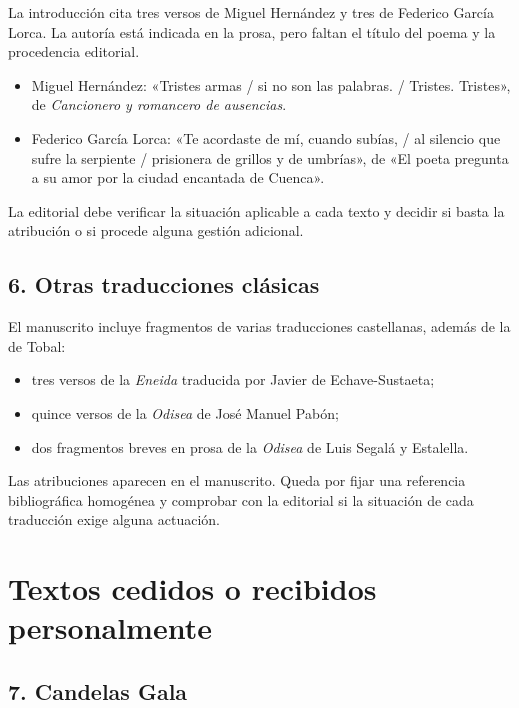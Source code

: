 \documentclass[12pt,a4paper]{article}
\begin{document}
La introducción cita tres versos de Miguel Hernández y tres de Federico García Lorca. La autoría está indicada en la prosa, pero faltan el título del poema y la procedencia editorial.

\begin{itemize}[leftmargin=*]
  \item Miguel Hernández: «Tristes armas / si no son las palabras. / Tristes. Tristes», de \emph{Cancionero y romancero de ausencias}.
  \item Federico García Lorca: «Te acordaste de mí, cuando subías, / al silencio que sufre la serpiente / prisionera de grillos y de umbrías», de «El poeta pregunta a su amor por la ciudad encantada de Cuenca».
\end{itemize}

La editorial debe verificar la situación aplicable a cada texto y decidir si basta la atribución o si procede alguna gestión adicional.

\subsection*{6. Otras traducciones clásicas}

El manuscrito incluye fragmentos de varias traducciones castellanas, además de la de Tobal:

\begin{itemize}[leftmargin=*]
  \item tres versos de la \emph{Eneida} traducida por Javier de Echave-Sustaeta;
  \item quince versos de la \emph{Odisea} de José Manuel Pabón;
  \item dos fragmentos breves en prosa de la \emph{Odisea} de Luis Segalá y Estalella.
\end{itemize}

Las atribuciones aparecen en el manuscrito. Queda por fijar una referencia bibliográfica homogénea y comprobar con la editorial si la situación de cada traducción exige alguna actuación.

\section*{Textos cedidos o recibidos personalmente}

\subsection*{7. Candelas Gala}
\end{document}
